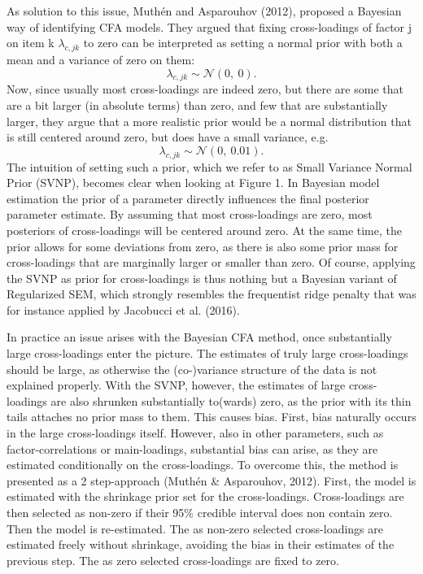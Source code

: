 \documentclass[
  man, donotrepeattitle,floatsintext]{apa6}
\begin{document}
As solution to this issue, Muthén and Asparouhov (2012), proposed a Bayesian way of identifying CFA models. They argued that fixing cross-loadings of factor j on item k \(\lambda_{c,jk}\) to zero can be interpreted as setting a normal prior with both a mean and a variance of zero on them:
\[\lambda_{c,jk}  \sim \mathcal{N}(0, \ 0).\]
Now, since usually most cross-loadings are indeed zero, but there are some that are a bit larger (in absolute terms) than zero, and few that are substantially larger, they argue that a more realistic prior would be a normal distribution that is still centered around zero, but does have a small variance, e.g.~
\[\lambda_{c,jk}  \sim \mathcal{N}(0, \ 0.01).\]
The intuition of setting such a prior, which we refer to as Small Variance Normal Prior (SVNP), becomes clear when looking at Figure 1. In Bayesian model estimation the prior of a parameter directly influences the final posterior parameter estimate. By assuming that most cross-loadings are zero, most posteriors of cross-loadings will be centered around zero. At the same time, the prior allows for some deviations from zero, as there is also some prior mass for cross-loadings that are marginally larger or smaller than zero. Of course, applying the SVNP as prior for cross-loadings is thus nothing but a Bayesian variant of Regularized SEM, which strongly resembles the frequentist ridge penalty that was for instance applied by Jacobucci et al. (2016).

In practice an issue arises with the Bayesian CFA method, once substantially large cross-loadings enter the picture. The estimates of truly large cross-loadings should be large, as otherwise the (co-)variance structure of the data is not explained properly. With the SVNP, however, the estimates of large cross-loadings are also shrunken substantially to(wards) zero, as the prior with its thin tails attaches no prior mass to them. This causes bias. First, bias naturally occurs in the large cross-loadings itself. However, also in other parameters, such as factor-correlations or main-loadings, substantial bias can arise, as they are estimated conditionally on the cross-loadings. To overcome this, the method is presented as a 2 step-approach (Muthén \& Asparouhov, 2012). First, the model is estimated with the shrinkage prior set for the cross-loadings. Cross-loadings are then selected as non-zero if their 95\% credible interval does non contain zero. Then the model is re-estimated. The as non-zero selected cross-loadings are estimated freely without shrinkage, avoiding the bias in their estimates of the previous step. The as zero selected cross-loadings are fixed to zero.
\end{document}
